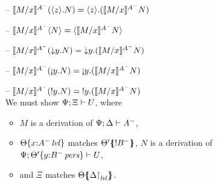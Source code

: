 \begin{itemize}
\smallskip

\item[--] $\rsubsta{M}{x}{(\tetap{z}{N})}{A^-} 
           = \tetap{z}{(\rsubsta{M}{x}{N}{A^-})}$
\item[--] $\rsubsta{M}{x}{\tetan{N}}{A^-} 
           = \tetan{\rsubsta{M}{x}{N}{A^-}}$

\item[--] $\rsubsta{M}{x}{(\tdownl{y}{N})}{A^-} 
           = \tdownl{y}{(\rsubsta{M}{x}{N}{A^-})}$

\item[--] $\rsubsta{M}{x}{(\tgnabl{y}{N})}{A^-} 
           = \tgnabl{y}{(\rsubsta{M}{x}{N}{A^-})}$ %

\newpage

\item[--] $\rsubsta{M}{x}{(\tbangl{y}{N})}{A^-} 
           = \tbangl{y}{(\rsubsta{M}{x}{N}{A^-})}$\smallskip\\
  We must show $\foc{\Psi}{\Xi}{U}$, where
  \begin{itemize}
  \item $M$ is a derivation of $\foc{\Psi}{\Delta}{A^-}$, 
  \item $\tackon{\Theta}{x{:}\islvl{A^-}}$ matches 
     $\frameoff{\Theta'}{{!}B^-}$, $N$ is a derivation of 
     $\foc{\Psi}{\tackon{\Theta'}{y{:}\ispers{B^-}}}{U}$,
  \item and $\Xi$ matches $\frameoff{\Theta}{\restrictto{\Delta}{\mlvl}}$.
  \end{itemize}
 

\end{itemize}
